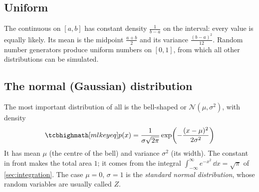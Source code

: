 \subsection{Uniform}

The continuous  on $[a, b]$ has constant density
$\frac{1}{b - a}$ on the interval: every value is equally likely. Its mean is the
midpoint $\frac{a + b}{2}$ and its variance $\frac{(b - a)^2}{12}$. Random number
generators produce uniform numbers on $[0, 1]$, from which all other
distributions can be simulated.

\subsection{The normal (Gaussian) distribution}

The most important distribution of all is the bell-shaped
 or 
$\mathcal{N}(\mu, \sigma^2)$, with density
\[
  \keyeq{p(x) = \frac{1}{\sigma\sqrt{2\pi}}\exp\!\left(-\frac{(x - \mu)^2}{2\sigma^2}\right)}
\]
It has mean $\mu$ (the centre of the bell) and variance $\sigma^2$ (its width).
The constant in front makes the total area $1$; it comes from the integral
$\int_{-\infty}^{\infty}e^{-x^2}\,\dd x = \sqrt\pi$ of \cref{sec:integration}. The case $\mu = 0$,
$\sigma = 1$ is the \emph{standard normal distribution}, whose random variables are
usually called $Z$.

